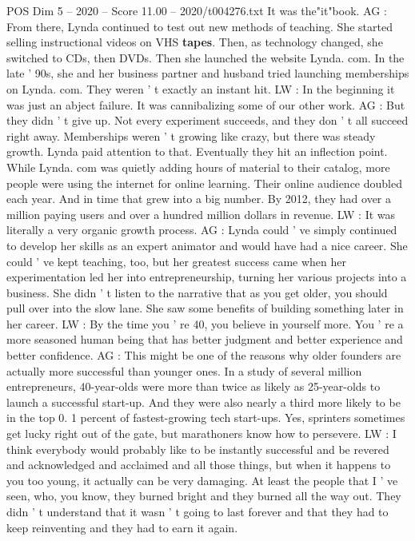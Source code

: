 \begin{textsample}{POS Dim 5 – 2020 – Score 11.00 – 2020/t004276.txt}
It was the"it"book.
AG : From there, Lynda continued to test out new methods of teaching.
She started selling instructional videos on VHS \textbf{tapes}.
Then, as technology changed, she switched to CDs, then DVDs.
Then she launched the website Lynda. com.
In the late ' 90s, she and her business partner and husband tried launching memberships on Lynda. com.
They weren ' t exactly an instant hit.
LW : In the beginning it was just an abject failure.
It was cannibalizing some of our other work.
AG : But they didn ' t give up.
Not every experiment succeeds, and they don ' t all succeed right away.
Memberships weren ' t growing like crazy, but there was steady growth.
Lynda paid attention to that.
Eventually they hit an inflection point.
While Lynda. com was quietly adding hours of material to their catalog, more people were using the internet for online learning.
Their online audience doubled each year.
And in time that grew into a big number.
By 2012, they had over a million paying users and over a hundred million dollars in revenue.
LW : It was literally a very organic growth process.
AG : Lynda could ' ve simply continued to develop her skills as an expert animator and would have had a nice career.
She could ' ve kept teaching, too, but her greatest success came when her experimentation led her into entrepreneurship, turning her various projects into a business.
She didn ' t listen to the narrative that as you get older, you should pull over into the slow lane.
She saw some benefits of building something later in her career.
LW : By the time you ' re 40, you believe in yourself more.
You ' re a more seasoned human being that has better judgment and better experience and better confidence.
AG : This might be one of the reasons why older founders are actually more successful than younger ones.
In a study of several million entrepreneurs, 40-year-olds were more than twice as likely as 25-year-olds to launch a successful start-up.
And they were also nearly a third more likely to be in the top 0. 1 percent of fastest-growing tech start-ups.
Yes, sprinters sometimes get lucky right out of the gate, but marathoners know how to persevere.
LW : I think everybody would probably like to be instantly successful and be revered and acknowledged and acclaimed and all those things, but when it happens to you too young, it actually can be very damaging.
At least the people that I ' ve seen, who, you know, they burned bright and they burned all the way out.
They didn ' t understand that it wasn ' t going to last forever and that they had to keep reinventing and they had to earn it again.

\end{textsample}
